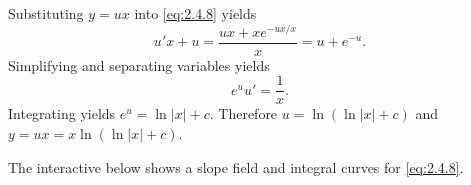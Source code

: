 \documentclass{ximera}
\begin{document}
Substituting  $y=ux$
into \eqref{eq:2.4.8} yields
$$
u'x+u =  \frac{ux+xe^{-ux/x}}{x} = u+e^{-u}.
$$
 Simplifying and separating variables yields
$$
e^uu'=\frac{1}{x}.
$$
Integrating yields
$e^u=\ln |x|+c$.
Therefore
$u=\ln(\ln|x|+c)$ and
$y=ux=x \ln (\ln |x|+c)$.

The interactive below shows
a slope field and integral curves for \eqref{eq:2.4.8}.

\begin{center}
\end{center}
\end{document}
